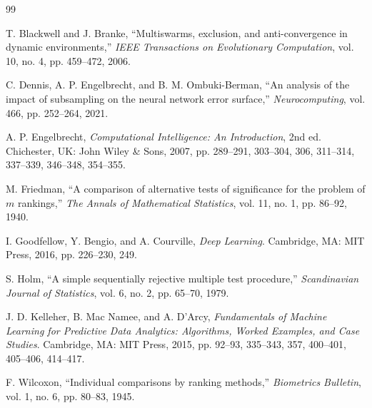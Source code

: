 \documentclass[conference]{IEEEtran}
\begin{document}
\begin{thebibliography}{99}

T. Blackwell and J. Branke, ``Multiswarms, exclusion, and
anti-convergence in dynamic environments,'' \textit{IEEE Transactions
on Evolutionary Computation}, vol. 10, no. 4, pp. 459--472, 2006.

C. Dennis, A. P. Engelbrecht, and B. M. Ombuki-Berman, ``An analysis
of the impact of subsampling on the neural network error surface,''
\textit{Neurocomputing}, vol. 466, pp. 252--264, 2021.

A. P. Engelbrecht, \textit{Computational Intelligence: An
Introduction}, 2nd ed. Chichester, UK: John Wiley \& Sons, 2007,
pp. 289--291, 303--304, 306, 311--314, 337--339, 346--348, 354--355.

M. Friedman, ``A comparison of alternative tests of significance for
the problem of $m$ rankings,'' \textit{The Annals of Mathematical
Statistics}, vol. 11, no. 1, pp. 86--92, 1940.

I. Goodfellow, Y. Bengio, and A. Courville, \textit{Deep Learning}.
Cambridge, MA: MIT Press, 2016, pp. 226--230, 249.

S. Holm, ``A simple sequentially rejective multiple test procedure,''
\textit{Scandinavian Journal of Statistics}, vol. 6, no. 2,
pp. 65--70, 1979.

J. D. Kelleher, B. Mac Namee, and A. D'Arcy, \textit{Fundamentals of
Machine Learning for Predictive Data Analytics: Algorithms, Worked
Examples, and Case Studies}. Cambridge, MA: MIT Press, 2015,
pp. 92--93, 335--343, 357, 400--401, 405--406, 414--417.

F. Wilcoxon, ``Individual comparisons by ranking methods,''
\textit{Biometrics Bulletin}, vol. 1, no. 6, pp. 80--83, 1945.

\end{thebibliography}
\end{document}

